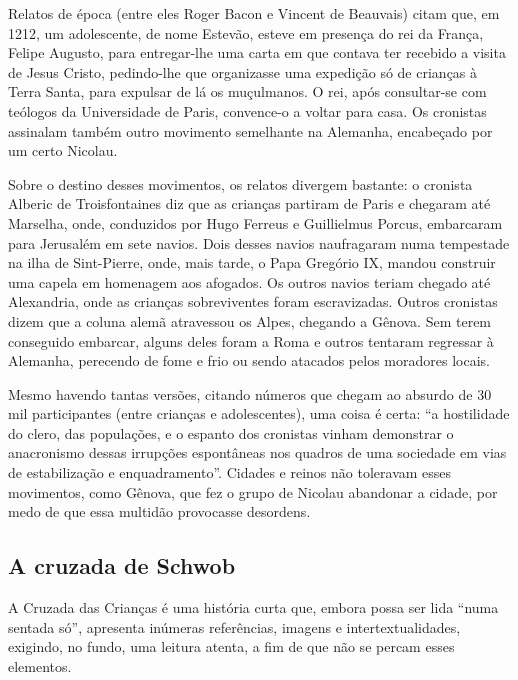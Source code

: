 \documentclass[12pt]{extarticle}
\begin{document}


Relatos de época (entre eles Roger Bacon e Vincent de Beauvais) citam
que, em 1212, um adolescente, de nome Estevão, esteve em presença do rei
da França, Felipe Augusto, para entregar-lhe uma carta em que contava
ter recebido a visita de Jesus Cristo, pedindo-lhe que organizasse uma
expedição só de crianças à Terra Santa, para expulsar de lá os
muçulmanos. O rei, após consultar-se com teólogos da Universidade de
Paris, convence-o a voltar para casa. Os cronistas assinalam também
outro movimento semelhante na Alemanha, encabeçado por um certo
Nicolau.

Sobre o destino desses movimentos, os relatos divergem bastante: o
cronista Alberic de Troisfontaines diz que as crianças partiram de Paris
e chegaram até Marselha, onde, conduzidos por Hugo Ferreus e Guillielmus
Porcus, embarcaram para Jerusalém em sete navios. Dois desses navios
naufragaram numa tempestade na ilha de Sint-Pierre, onde, mais tarde, o
Papa Gregório IX, mandou construir uma capela em homenagem aos afogados.
Os outros navios teriam chegado até Alexandria, onde as crianças
sobreviventes foram escravizadas. Outros cronistas dizem que a coluna
alemã atravessou os Alpes, chegando a Gênova. Sem terem conseguido
embarcar, alguns deles foram a Roma e outros tentaram regressar à
Alemanha, perecendo de fome e frio ou sendo atacados pelos moradores
locais.

Mesmo havendo tantas versões, citando números que chegam ao absurdo de
30 mil participantes (entre crianças e adolescentes), uma coisa é certa:
``a hostilidade do clero, das populações, e o espanto dos cronistas
vinham demonstrar o anacronismo dessas irrupções espontâneas nos quadros
de uma sociedade em vias de estabilização e enquadramento''. Cidades e
reinos não toleravam esses movimentos, como Gênova, que fez o grupo de
Nicolau abandonar a cidade, por medo de que essa multidão provocasse
desordens.

\subsection{A cruzada de Schwob}

A Cruzada das Crianças é uma história curta que, embora possa ser lida
``numa sentada só'', apresenta inúmeras referências, imagens e
intertextualidades, exigindo, no fundo, uma leitura atenta, a fim de que
não se percam esses elementos.
\end{document}
